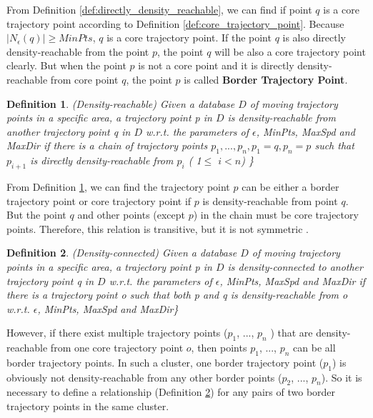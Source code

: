 \documentclass[12pt,glossary]{dalcsthesis}
\newtheorem{definition}{Definition}
\begin{document}
From Definition \ref{def:directly_density_reachable}, we can find if point $q$ is a core trajectory point according to Definition \ref{def:core_trajectory_point}. Because $\left|N_{\epsilon}(q)\right| \geq MinPts$, $q$ is a core trajectory point. If the point $q$ is also directly density-reachable from the point $p$, the point $q$ will be also a core trajectory point clearly. But when the point $p$ is not a core point and it is directly density-reachable from core point $q$, the point $p$ is called \textbf{Border Trajectory Point}.

\begin{definition}
\label{def:density_reachable}
(Density-reachable)
Given a database $D$ of moving trajectory points in a specific area, a trajectory point p in $D$ is density-reachable from another trajectory point q in $D$ w.r.t. the parameters of $\epsilon$, MinPts, MaxSpd and MaxDir if there is a chain of trajectory points $p_1,..., p_n, p_1 = q, p_n = p$ such that $p_{i+1}$ is directly density-reachable from $p_i$  ( 1$\leq$ $i<n$) \}
\end{definition}

From Definition \ref{def:density_reachable}, we can find the trajectory point $p$ can be either a border trajectory point or core trajectory point if $p$ is density-reachable from point $q$. But the point $q$ and other points (except $p$) in the chain must be core trajectory points. Therefore, this relation is transitive, but it is not symmetric \cite{DBScan96}.


\begin{definition}
\label{def:density_connected}
(Density-connected)
Given a database $D$ of moving trajectory points in a specific area, a trajectory point p in $D$ is density-connected to another trajectory point q in $D$ w.r.t. the parameters of $\epsilon$, MinPts, MaxSpd and MaxDir if there is a trajectory point o such that both p and q is density-reachable from o w.r.t.  $\epsilon$, MinPts, MaxSpd and MaxDir\}
\end{definition}

However, if there exist multiple trajectory points ($p_1$, ..., $p_n$ ) that are density-reachable from one core trajectory point $o$, then points $p_1$, ..., $p_n$ can be all border trajectory points.  In such a cluster, one border trajectory point ($p_1$) is obviously not density-reachable from any other border points ($p_2$, ..., $p_n$). So it is necessary to define a relationship (Definition \ref{def:density_connected}) for any pairs of two border trajectory points in the same cluster.
\end{document}
